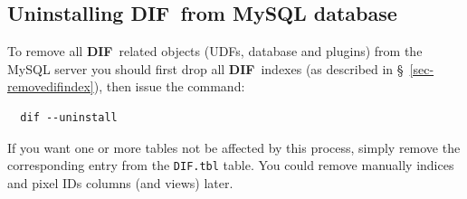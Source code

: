 \documentclass[10pt,titlepage]{article}
\newcommand{\dif}{\textbf{\small DIF}}
\begin{document}
%
\subsection{Uninstalling \dif\ from MySQL database}
To remove all \dif\ related objects (UDFs, database and plugins) from
the MySQL server you should first drop all \dif\ indexes (as described in
\S\ \ref{sec-removedifindex}), then issue the command:
\begin{verbatim}
  dif --uninstall
\end{verbatim}
%
If you want one or more tables not be affected by this process, simply remove
the corresponding entry from the \verb|DIF.tbl| table. You could remove
manually indices and pixel IDs columns (and views) later.

%
%
%
%
\end{document}
